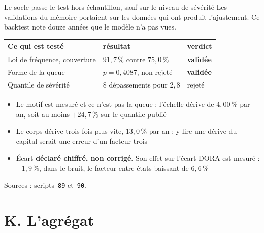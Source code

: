 \documentclass[11pt]{beamer}
\begin{document}
\begin{frame}{Le socle passe le test hors échantillon, sauf sur le niveau de sévérité}
\small
Les validations du mémoire portaient sur les données qui ont produit l'ajustement. Ce backtest
note douze années que le modèle n'a pas vues.
\vspace{1mm}

\begin{center}\small
\begin{tabular}{@{}l l l@{}}
\toprule
\textbf{Ce qui est testé} & \textbf{résultat} & \textbf{verdict} \\
\midrule
Loi de fréquence, couverture & $91{,}7\,\%$ contre $75{,}0\,\%$ & \textbf{validée} \\
Forme de la queue & $p = 0{,}4087$, non rejeté & \textbf{validée} \\
Quantile de sévérité & $8$ dépassements pour $2{,}8$ & \alert{rejeté} \\
\bottomrule
\end{tabular}
\end{center}
\vspace{2mm}

\begin{itemize}\itemsep4pt
  \item \alert{Le motif est mesuré et ce n'est pas la queue} : l'échelle dérive de
        $4{,}00\,\%$ par an, soit au moins $+24{,}7\,\%$ sur le quantile publié
  \item Le corps dérive trois fois plus vite, $13{,}0\,\%$ par an : y lire une dérive du
        capital serait une erreur d'un facteur trois
  \item Écart \textbf{déclaré chiffré, non corrigé}. Son effet sur l'écart DORA est mesuré :
        $-1{,}9\,\%$, dans le bruit, le facteur entre états baissant de $6{,}6\,\%$
\end{itemize}
\vspace{1mm}
{\scriptsize Sources : scripts~\texttt{89} et~\texttt{90}.}
\end{frame}

\section*{K. L'agrégat}
\end{document}
